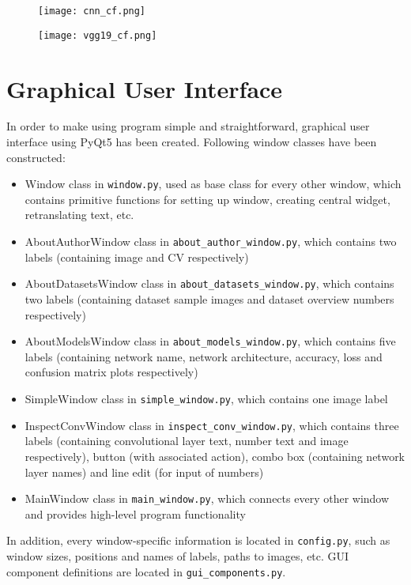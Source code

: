 \begin{figure}[h]
	\centering
	\begin{minipage}{.5\textwidth}
		\centering
		\texttt{[image: cnn\_cf.png]}
		\label{fig:cnncf}
	\end{minipage}%
	\begin{minipage}{.5\textwidth}
		\centering
		\texttt{[image: vgg19\_cf.png]}
		\label{fig:vgg19cf}
	\end{minipage}
\end{figure}

\section{Graphical User Interface} 
\label{gui}

In order to make using program simple and straightforward, graphical user interface using PyQt5 has been created. Following window classes have been constructed:
\begin{itemize}
	\itemsep 0em
	\item Window class in \texttt{window.py}, used as base class for every other window, which contains primitive functions for setting up window, creating central widget, retranslating text, etc.
	\item AboutAuthorWindow class in \texttt{about\_author\_window.py}, which contains two labels (containing image and CV respectively)
	\item AboutDatasetsWindow class in \texttt{about\_datasets\_window.py}, which contains two labels (containing dataset sample images and dataset overview numbers respectively)
	\item AboutModelsWindow class in \texttt{about\_models\_window.py}, which contains five labels (containing network name, network architecture, accuracy, loss and confusion matrix plots respectively)
	\item SimpleWindow class in \texttt{simple\_window.py}, which contains one image label
	\item InspectConvWindow class in \texttt{inspect\_conv\_window.py}, which contains three labels (containing convolutional layer text, number text and image respectively), button (with associated action), combo box (containing network layer names)  and line edit (for input of numbers)
	\item MainWindow class in \texttt{main\_window.py}, which connects every other window and provides high-level program functionality 
\end{itemize}
In addition, every window-specific information is located in \texttt{config.py}, such as window sizes, positions and names of labels, paths to images, etc. GUI component definitions are located in \texttt{gui\_components.py}.

